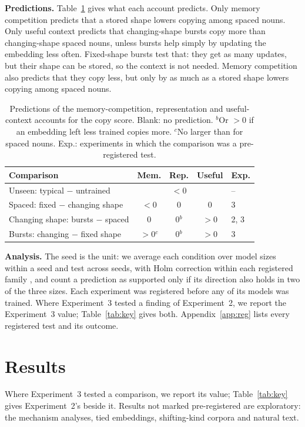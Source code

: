 \documentclass[11pt]{article}
\begin{document}
\textbf{Predictions.} Table~\ref{tab:pred} gives what each account predicts. Only memory competition predicts that a stored shape lowers copying among spaced nouns. Only useful context predicts that changing-shape bursts copy more than changing-shape spaced nouns, unless bursts help simply by updating the embedding less often. Fixed-shape bursts test that: they get as many updates, but their shape can be stored, so the context is not needed. Memory competition also predicts that they copy less, but only by as much as a stored shape lowers copying among spaced nouns.

\begin{table}[t]
\centering
\small
\setlength{\tabcolsep}{2pt}
\begin{tabular}{@{}p{}cccl@{}}
\toprule
Comparison & Mem. & Rep. & Useful & Exp. \\
\midrule
Unseen: typical $-$ untrained & & $<$0 & & -- \\
Spaced: fixed $-$ changing shape & $<$0 & 0 & 0 & 3 \\
Changing shape: bursts $-$ spaced & 0 & 0$^b$ & $>$0 & 2, 3 \\
Bursts: changing $-$ fixed shape & $>$0$^c$ & 0$^b$ & $>$0 & 3 \\
\bottomrule
\end{tabular}
\caption{Predictions of the memory-competition, representation and useful-context accounts for the copy score. Blank: no prediction. $^b$Or $>$0 if an embedding left less trained copies more. $^c$No larger than for spaced nouns. Exp.: experiments in which the comparison was a pre-registered test.}
\label{tab:pred}
\end{table}

\textbf{Analysis.} The seed is the unit: we average each condition over model sizes within a seed and test across seeds, with Holm correction within each registered family \citep{holm1979}, and count a prediction as supported only if its direction also holds in two of the three sizes. Each experiment was registered before any of its models was trained. Where Experiment~3 tested a finding of Experiment~2, we report the Experiment~3 value; Table~\ref{tab:key} gives both. Appendix~\ref{app:reg} lists every registered test and its outcome.

\section{Results}\label{sec:results}
Where Experiment~3 tested a comparison, we report its value; Table~\ref{tab:key} gives Experiment~2's beside it. Results not marked pre-registered are exploratory: the mechanism analyses, tied embeddings, shifting-kind corpora and natural text.
\end{document}
